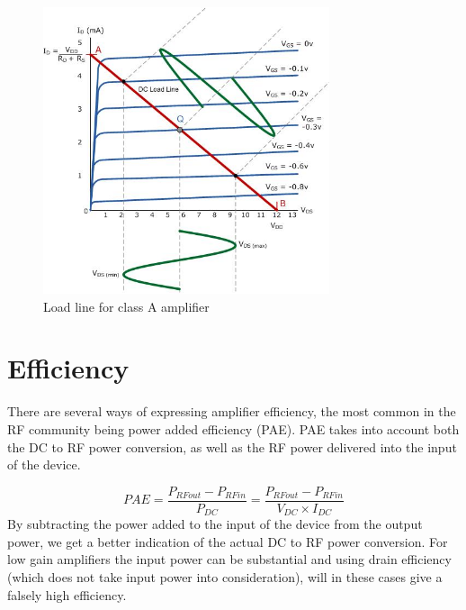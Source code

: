\begin{figure}[H]
	  \centering
	  \includegraphics[width=0.75\textwidth]{img/Load_line_graphics}
	  \caption{Load line for class A amplifier}
	  \label{fig:fig_Load_line}
\end{figure}

\section{Efficiency}
There are several ways of expressing amplifier efficiency, the most common in the RF community being power added efficiency (PAE). PAE takes into account both the DC to RF power conversion, as well as the RF power delivered into the input of the device.

\begin{equation}
	PAE=\frac{P_{RFout}-P_{RFin}}{P_{DC}}=\frac{P_{RFout}-P_{RFin}}{V_{DC} \times I_{DC}} 
\end{equation}
By subtracting the power added to the input of the device from the output power, we get a better indication of the actual DC to RF power conversion. For low gain amplifiers the input power can be substantial and using drain efficiency (which does not take input power into consideration), will in these cases give a falsely high efficiency.
